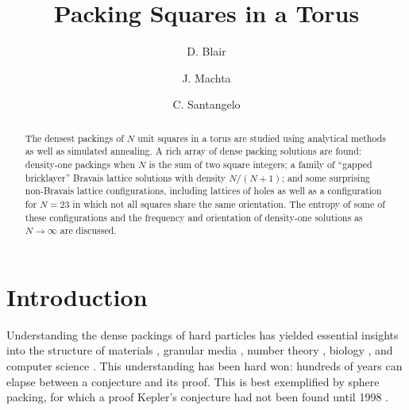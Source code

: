 \documentclass[preprint,aps]{revtex4}
\begin{document}
\title{Packing Squares in a Torus}

\author{D. Blair}

\author{J. Machta}

\author{C. Santangelo}

\begin{abstract}
The densest packings of $N$ unit squares in a torus are studied using analytical methods as well as simulated annealing.  A rich array of dense packing solutions are found: density-one packings when $N$ is the sum of two square integers; a family of ``gapped bricklayer'' Bravais lattice solutions with density $N/(N+1)$; and some surprising non-Bravais lattice configurations, including lattices of holes as well as a configuration for $N=23$ in which not all squares share the same orientation.  The entropy of some of these configurations and the frequency and orientation of density-one solutions as $N \rightarrow \infty$ are discussed.

\end{abstract} 
\maketitle

%
\section{Introduction}

Understanding the dense packings of hard particles has yielded essential insights into the structure of materials \cite{Bernal1964,Zallen1983,Torquato2002,Chaikin2000}, granular media \cite{Torquato2002,Mehta1994}, number theory \cite{COHNa,Conway1999}, biology 
\cite{Gevertz2008,Purohit2003}, and computer science \cite{Johnson1974,Lodi2002}. This understanding has been hard won: hundreds of years can elapse between a conjecture and its proof. This is best exemplified by sphere packing, for which a proof Kepler's conjecture had not been found until 1998 \cite{HALESa}.
\end{document}
